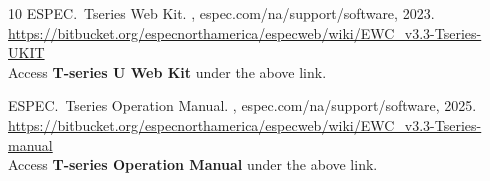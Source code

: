 \begin{frame}[allowframebreaks]
\begin{thebibliography}{10}
    ESPEC.~Tseries Web Kit.
    , espec.com/na/support/software, 2023. \\
    {\url{https://bitbucket.org/especnorthamerica/especweb/wiki/EWC_v3.3-Tseries-UKIT}} \\
    Access {\bf{T-series U Web Kit}} under the above link.  

    ESPEC.~Tseries Operation Manual.
    , espec.com/na/support/software, 2025. \\
    {\url{https://bitbucket.org/especnorthamerica/especweb/wiki/EWC_v3.3-Tseries-manual}} \\
    Access {\bf{T-series Operation Manual}} under the above link.  



  \end{thebibliography}
\end{frame}